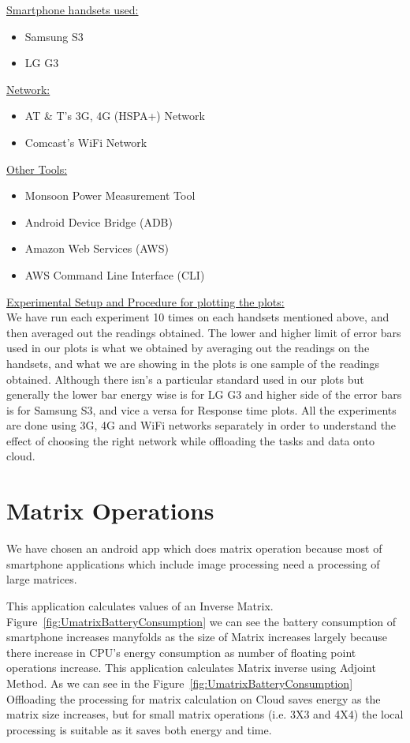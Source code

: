 \documentclass{report}
\begin{document}
\underline{Smartphone handsets used:}
\begin{itemize}
\item Samsung S3
\item LG G3

\end{itemize}

\underline{Network:}
\begin{itemize}
\item AT \& T's 3G, 4G (HSPA+) Network
\item Comcast's WiFi Network
\end{itemize}

\underline{Other Tools:}
\begin{itemize}
\item Monsoon Power Measurement Tool
\item Android Device Bridge (ADB)
\item Amazon Web Services (AWS)
\item AWS Command Line Interface (CLI)
\end{itemize}

\underline{Experimental Setup and Procedure for plotting the plots:}\\


We have run each experiment 10 times on each handsets mentioned above, and then averaged out the readings obtained. The lower and higher limit of error bars used in our plots is what we obtained by averaging out the readings on the handsets, and what we are showing in the plots is one sample of the readings obtained. Although there isn's a particular standard used in our plots but generally the lower bar energy wise is for LG G3 and higher side of the error bars is for Samsung S3, and vice a versa for Response time plots. All the experiments are done using 3G, 4G and WiFi networks separately in order to understand the effect of choosing the right network while offloading the tasks and data onto cloud.

\section{Matrix Operations}
We have chosen an android app which does matrix operation because most of smartphone applications which include image processing  need a processing of large matrices.

This application calculates values of an Inverse Matrix. Figure~\ref{fig:UmatrixBatteryConsumption} we can see the battery consumption
of smartphone increases manyfolds as the size of Matrix increases largely because there increase in CPU's energy consumption as number of floating point operations increase. This application calculates Matrix inverse using Adjoint Method. As we can see in the Figure~\ref{fig:UmatrixBatteryConsumption} Offloading the processing for matrix calculation on Cloud saves energy as the matrix size increases, but for small matrix operations (i.e. 3X3 and 4X4) the local processing is suitable as it saves both energy and time.
\end{document}
